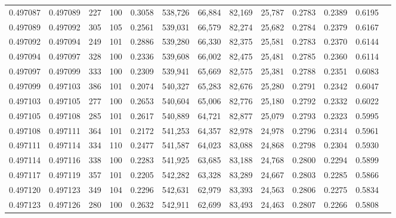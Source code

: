 \begin{tabular}{rrrrrrrrrrrrr}
0.497087 & 0.497089 &   227 & 100 &                                     0.3058 & 538,726 &  66,884 &  82,169 &  25,787 & 0.2783 & 0.2389 & 0.6195 \\
0.497089 & 0.497092 &   305 & 105 &                                     0.2561 & 539,031 &  66,579 &  82,274 &  25,682 & 0.2784 & 0.2379 & 0.6167 \\
0.497092 & 0.497094 &   249 & 101 &                                     0.2886 & 539,280 &  66,330 &  82,375 &  25,581 & 0.2783 & 0.2370 & 0.6144 \\
0.497094 & 0.497097 &   328 & 100 &                                     0.2336 & 539,608 &  66,002 &  82,475 &  25,481 & 0.2785 & 0.2360 & 0.6114 \\
0.497097 & 0.497099 &   333 & 100 &                                     0.2309 & 539,941 &  65,669 &  82,575 &  25,381 & 0.2788 & 0.2351 & 0.6083 \\
0.497099 & 0.497103 &   386 & 101 &                                     0.2074 & 540,327 &  65,283 &  82,676 &  25,280 & 0.2791 & 0.2342 & 0.6047 \\
0.497103 & 0.497105 &   277 & 100 &                                     0.2653 & 540,604 &  65,006 &  82,776 &  25,180 & 0.2792 & 0.2332 & 0.6022 \\
0.497105 & 0.497108 &   285 & 101 &                                     0.2617 & 540,889 &  64,721 &  82,877 &  25,079 & 0.2793 & 0.2323 & 0.5995 \\
0.497108 & 0.497111 &   364 & 101 &                                     0.2172 & 541,253 &  64,357 &  82,978 &  24,978 & 0.2796 & 0.2314 & 0.5961 \\
0.497111 & 0.497114 &   334 & 110 &                                     0.2477 & 541,587 &  64,023 &  83,088 &  24,868 & 0.2798 & 0.2304 & 0.5930 \\
0.497114 & 0.497116 &   338 & 100 &                                     0.2283 & 541,925 &  63,685 &  83,188 &  24,768 & 0.2800 & 0.2294 & 0.5899 \\
0.497117 & 0.497119 &   357 & 101 &                                     0.2205 & 542,282 &  63,328 &  83,289 &  24,667 & 0.2803 & 0.2285 & 0.5866 \\
0.497120 & 0.497123 &   349 & 104 &                                     0.2296 & 542,631 &  62,979 &  83,393 &  24,563 & 0.2806 & 0.2275 & 0.5834 \\
0.497123 & 0.497126 &   280 & 100 &                                     0.2632 & 542,911 &  62,699 &  83,493 &  24,463 & 0.2807 & 0.2266 & 0.5808 \\

\end{tabular}
